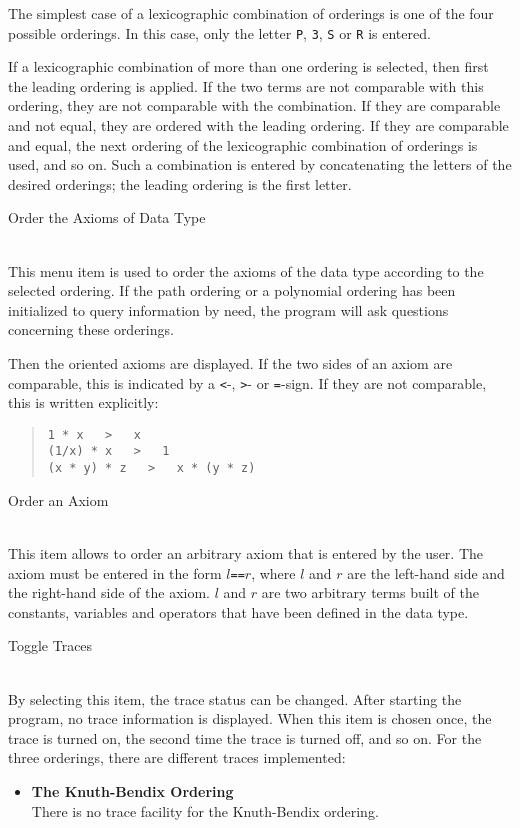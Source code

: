 \begin{enumerate}
The simplest case of a lexicographic combination of orderings is
one of the four possible orderings. In this case, only the letter {\tt P},
{\tt 3}, {\tt S} or {\tt R} is entered.

If a lexicographic combination of more 
than one ordering is selected, then first the leading ordering is
applied. If the two terms are not comparable with this ordering, they
are not comparable with the combination. If they are comparable and not
equal, they are ordered with the leading ordering. If they are
comparable and equal, the next ordering of the lexicographic combination
of orderings is used, and so on. Such a combination is entered by 
concatenating the letters of the desired orderings; the leading ordering 
is the first letter.

{\bf \item{Order the Axioms of Data Type}}\\
This menu item is used to order the axioms of the data
type according to the selected ordering. If the path ordering
or a polynomial ordering has been initialized to query information by
need, the program will ask questions concerning these orderings.

Then the oriented axioms are displayed. If the two sides of an axiom are 
comparable, this is indicated by a {\tt <}-, {\tt >}- or {\tt =}-sign.
If they are not comparable, this is written explicitly:
\begin{quote}
\begin{verbatim}
1 * x   >   x
(1/x) * x   >   1
(x * y) * z   >   x * (y * z)
\end{verbatim}
\end{quote}

{\bf \item{Order an Axiom}}\\
This item allows to order an arbitrary axiom
that is entered by the user. The axiom must be entered in the form 
$l${\tt ==}$r$, where $l$ and $r$ are the left-hand side and the right-hand
side of the axiom. $l$ and $r$ are two arbitrary terms built of the
constants, variables and operators that have been defined in the data
type.

{\bf \item{Toggle Traces}}\\
By selecting this item, the trace status can be changed. After
starting the program, no trace information is displayed. When this item
is chosen once, the trace is turned on, the second time the trace is
turned off, and so on.
For the three orderings, there are different traces implemented:
\begin{itemize}
\item{\bf The Knuth-Bendix Ordering}\\
There is no trace facility for the Knuth-Bendix ordering.


\end{itemize}
\end{enumerate}
